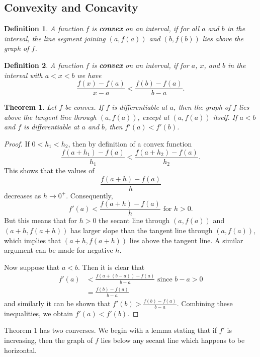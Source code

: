 \documentclass{article}
\numberwithin{corollary}{subsection}
\newtheorem{definition}{Definition}
\numberwithin{definition}{subsection}
\numberwithin{lemma}{subsection}
\newtheorem{theorem}{Theorem}
\numberwithin{theorem}{subsection}
\begin{document}
\subsection{Convexity and Concavity}

\begin{definition}
  A function $f$ is \textbf{convex} on an interval, if for all $a$ and $b$ in
  the interval, the line segment joining $(a, f(a))$ and $(b, f(b))$ lies above
  the graph of $f$.
\end{definition}

\begin{definition}
  A function $f$ is \textbf{convex} on an interval, if for $a$, $x$, and $b$ in
  the interval with $a < x < b$ we have \[
    \frac{f(x) - f(a)}{x - a} < \frac{f(b) - f(a)}{b - a}.
  \]
\end{definition}

\begin{theorem}
  Let $f$ be convex. If $f$ is differentiable at $a$, then the graph of $f$
  lies above the tangent line through $(a, f(a))$, except at $(a, f(a))$
  itself. If $a < b$ and $f$ is differentiable at $a$ and $b$, then $f'(a) <
  f'(b)$.
\end{theorem}
\begin{proof}
  If $0 < h_1 < h_2$, then by definition of a convex function \[
    \frac{f(a + h_1) - f(a)}{h_1} < \frac{f(a + h_2) - f(a)}{h_2}.
  \] This shows that the values of \[
    \frac{f(a + h) - f(a)}{h}
  \] decreases as $h \to 0^+$. Consequently, \[
    f'(a) < \frac{f(a + h) - f(a)}{h} \text{ for } h > 0.
  \] But this means that for $h > 0$ the secant line through $(a, f(a))$ and
  $(a + h, f(a + h))$ has larger slope than the tangent line through $(a,
  f(a))$, which implies that $(a + h, f(a + h))$ lies above the tangent line.
  A similar argument can be made for negative $h$.

  Now suppose that $a < b$. Then it is clear that
  \begin{align*}
    f'(a) &< \frac{f(a + (b - a)) - f(a)}{b - a} \text{ since } b - a > 0 \\
          &= \frac{f(b) - f(a)}{b - a}
  \end{align*}
  and similarly it can be shown that $f'(b) > \frac{f(b) - f(a)}{b - a}$.
  Combining these inequalities, we obtain $f'(a) < f'(b)$.
\end{proof}

Theorem 1 has two converses. We begin with a lemma stating that if $f'$ is
increasing, then the graph of $f$ lies below any secant line which happens to
be horizontal.
\end{document}
